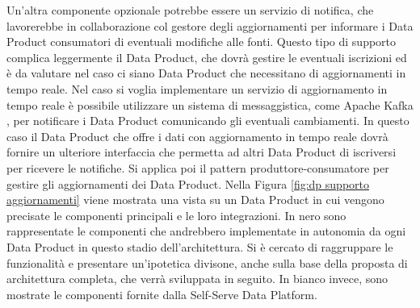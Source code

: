 \documentclass[12pt]{report}
\begin{document}
Un'altra componente opzionale potrebbe essere un servizio di notifica, che lavorerebbe in collaborazione col gestore degli aggiornamenti per informare i Data Product consumatori di eventuali modifiche alle fonti. 
Questo tipo di supporto complica leggermente il Data Product, che dovrà gestire le eventuali iscrizioni ed è da valutare nel caso ci siano Data Product che necessitano di aggiornamenti in tempo reale.
Nel caso si voglia implementare un servizio di aggiornamento in tempo reale è possibile utilizzare un sistema di messaggistica, come Apache Kafka \cite{kafka_docs}, per notificare i Data Product comunicando gli eventuali cambiamenti.
In questo caso il Data Product che offre i dati con aggiornamento in tempo reale dovrà fornire un ulteriore interfaccia che permetta ad altri Data Product di iscriversi per ricevere le notifiche.
Si applica poi il pattern produttore-consumatore per gestire gli aggiornamenti dei Data Product.
Nella Figura \ref{fig:dp supporto aggiornamenti} viene mostrata una vista su un Data Product in cui vengono precisate le componenti principali e le loro integrazioni.
In nero sono rappresentate le componenti che andrebbero implementate in autonomia da ogni Data Product in questo stadio dell'architettura.
Si è cercato di raggruppare le funzionalità e presentare un'ipotetica divisone, anche sulla base della proposta di architettura completa, che verrà sviluppata in seguito.
In bianco invece, sono mostrate le componenti fornite dalla Self-Serve Data Platform. 
\end{document}
